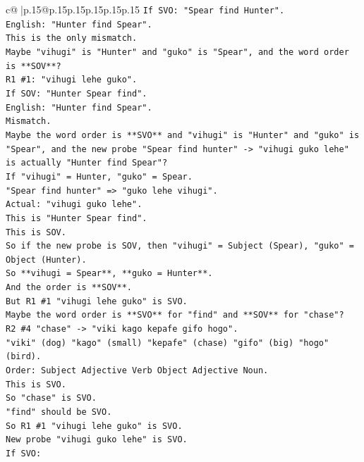 \documentclass{article}
\begin{document}
{\begin{supertabular}{c@{$\;$}|p{.15\linewidth}@{}p{.15\linewidth}p{.15\linewidth}p{.15\linewidth}p{.15\linewidth}p{.15\linewidth}}
{{{\texttt{If SVO: "Spear find Hunter".} \\
\texttt{English: "Hunter find Spear".} \\
\texttt{This is the only mismatch.} \\
\texttt{Maybe "vihugi" is "Hunter" and "guko" is "Spear", and the word order is **SOV**?} \\
\texttt{R1 \#1: "vihugi lehe guko".} \\
\texttt{If SOV: "Hunter Spear find".} \\
\texttt{English: "Hunter find Spear".} \\
\texttt{Mismatch.} \\
\texttt{Maybe the word order is **SVO** and "vihugi" is "Hunter" and "guko" is "Spear", and the new probe "Spear find hunter" {-}> "vihugi guko lehe" is actually "Hunter find Spear"?} \\
\texttt{If "vihugi" = Hunter, "guko" = Spear.} \\
\texttt{"Spear find hunter" => "guko lehe vihugi".} \\
\texttt{Actual: "vihugi guko lehe".} \\
\texttt{This is "Hunter Spear find".} \\
\texttt{This is SOV.} \\
\texttt{So if the new probe is SOV, then "vihugi" = Subject (Spear), "guko" = Object (Hunter).} \\
\texttt{So **vihugi = Spear**, **guko = Hunter**.} \\
\texttt{And the order is **SOV**.} \\
\texttt{But R1 \#1 "vihugi lehe guko" is SVO.} \\
\texttt{Maybe the word order is **SVO** for "find" and **SOV** for "chase"?} \\
\texttt{R2 \#4 "chase" {-}> "viki kago kepafe gifo hogo".} \\
\texttt{"viki" (dog) "kago" (small) "kepafe" (chase) "gifo" (big) "hogo" (bird).} \\
\texttt{Order: Subject Adjective Verb Object Adjective Noun.} \\
\texttt{This is SVO.} \\
\texttt{So "chase" is SVO.} \\
\texttt{"find" should be SVO.} \\
\texttt{So R1 \#1 "vihugi lehe guko" is SVO.} \\
\texttt{New probe "vihugi guko lehe" is SVO.} \\
\texttt{If SVO:} \\
}}}
\end{supertabular}}
\end{document}

